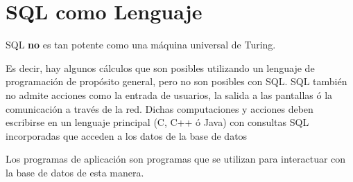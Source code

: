 \documentclass[12pt, fleqn]{report}                             %
\begin{document}
        \section{SQL como Lenguaje}
            
            SQL \textbf{no} es tan potente como una máquina universal de Turing.

            Es decir, hay algunos cálculos que son posibles utilizando un lenguaje de programación
            de propósito general, pero no son posibles con SQL.
            SQL también no admite acciones como la entrada de usuarios, la salida a las pantallas 
            ó la comunicación a través de la red.
            Dichas computaciones y acciones deben escribirse en un lenguaje principal (C, C++ ó Java)
            con consultas SQL incorporadas que acceden a los datos de la base de datos

            Los programas de aplicación son programas que se utilizan para interactuar con la base de datos de esta manera.
\end{document}
